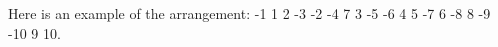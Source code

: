 \begin{solution}
Here is an example of the arrangement: -1 1 2 -3 -2 -4 7 3 -5 -6 4 5 -7 6 -8 8 -9 -10 9 10.
\end{solution}
